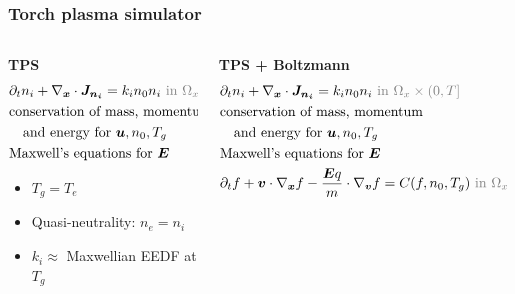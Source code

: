 \documentclass[mathserif, aspectratio=169]{beamer}
\newcommand{\vect}[1]{\boldsymbol{#1}}
\begin{document}
\begin{frame}
	\frametitle{Torch plasma simulator}
	\begin{columns}
		\begin{column}{0.48\textwidth}
			\textbf{TPS}
			\footnotesize
			\begin{align*}
				&\partial_t n_i + \nabla_{\vect{x}} \cdot \vect{J_{n_i}}  = k_i n_0 n_i  \color{gray}{\text{ in } \Omega_x \times (0,T]}\\
				&\text{conservation of mass, momentum} \\
				&\quad  \text{and energy for } \vect{u}, n_0, T_g \\
				&\text{Maxwell's equations for } \vect{E}
			\end{align*}
			\begin{itemize}
				\item $T_g=T_e$ %
				\item Quasi-neutrality: $n_e = n_i$ 
				\item $k_i \approx$ Maxwellian EEDF at $T_g$
			\end{itemize}
		\end{column}
		\begin{column}{0.48\textwidth}
			\textbf{TPS + Boltzmann}
			\footnotesize
			\begin{align*}
				&\partial_t n_i + \nabla_{\vect{x}} \cdot \vect{J_{n_i}}  = k_i n_0 n_i  \color{gray}{\text{ in } \Omega_x \times (0,T]}\\
				&\text{conservation of mass, momentum} \\
				&\quad  \text{and energy for } \vect{u}, n_0, T_g \\
				&\text{Maxwell's equations for } \vect{E}\\
				&\partial_t f  + \vect{v} \cdot \nabla_{\vect{x}} f -\frac{\vect{E} q}{m} \cdot \nabla_{\vect{v }}f = C(f, n_0, T_g) \color{gray}{\text{ in } \Omega_x \times \Omega_v \times (0,T]}

\end{align*}
\end{column}
\end{columns}
\end{frame}
\end{document}
